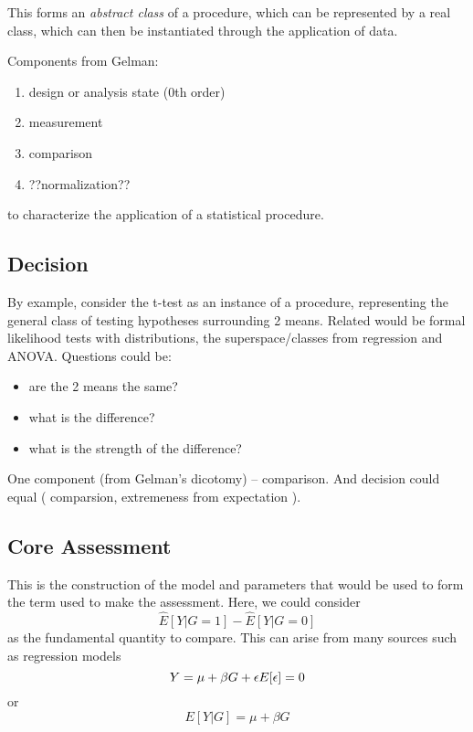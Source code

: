 \documentclass{article}
\begin{document}
This forms an \textit{abstract class} of a procedure, which can be
represented by a real class, which can then be instantiated through
the application of data.

Components from Gelman:
\begin{enumerate}
\item design or analysis state (0th order)
\item measurement
\item comparison
\item ??normalization??
\end{enumerate}
to characterize the application of a statistical procedure.

\subsection{Decision}
\label{sec:components:decision}

By example, consider the t-test as an instance of a procedure,
representing the general class of testing hypotheses surrounding 2
means.  Related would be formal likelihood tests with distributions,
the superspace/classes from regression and ANOVA.
Questions could be:
\begin{itemize}
\item are the 2 means the same?
\item what is the difference?
\item what is the strength of the difference?
\end{itemize}

One component (from Gelman's dicotomy) -- comparison.  And decision
could equal ( comparsion, extremeness from expectation ).


\subsection{Core Assessment}
\label{sec:components:assessment}

This is the construction of the model and parameters that would be
used to form the term used to make the assessment.  Here, we could
consider 
\begin{equation}
  \label{eq:assess:ex:1}
  \hat{E}[Y|G=1] - \hat{E}[Y|G=0]
\end{equation}
as the fundamental quantity to compare.    This can arise from many
sources such as regression models
\begin{equation}
  \label{eq:assess:ex:2}
  Y = \mu + \beta G + \epsilon \\
  E[\epsilon] = 0
\end{equation}
or 
\begin{equation}
  \label{eq:assess:ex:2}
  E[Y|G] = \mu + \beta G 
\end{equation}
\end{document}

